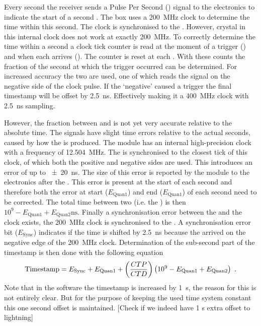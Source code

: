 Every second the \gps receiver sends a Pulse Per Second (\pps) signal to the \hisparc electronics to indicate the start of a second \cite{verkooijen2008firmware}. The \hisparc box uses a \SI{200}{\mega\hertz} clock to determine the time within this second. The clock is synchronised to the \pps. However, crystal in this internal clock does not work at exactly \SI{200}{\mega\hertz}. To correctly determine the time within a second a clock tick counter is read at the moment of a trigger (\ctd) and when each \pps arrives (\ctp). The counter is reset at each \pps. With these counts the fraction of the second at which the trigger occurred can be determined. For increased accuracy the two \adcs are used, one of which reads the signal on the negative side of the clock pulse. If the `negative' \adc caused a trigger the final timestamp will be offset by \SI{2.5}{\ns}. Effectively making it a \SI{400}{\mega\hertz} clock with \SI{2.5}{\ns} sampling.

However, the fraction between \ctd and \ctp is not yet very accurate relative to the absolute \gps time. The \pps signals have slight time errors relative to the actual \gps seconds, caused by how the \pps is produced. The \gps module has an internal high-precision clock with a frequency of  \SI{12.504}{\mega\hertz}. The \pps is synchronised to the closest tick of this clock, of which both the positive and negative sides are used. This introduces an error of up to \SI{\pm 20}{\ns}. The size of this error is reported by the \gps module to the electronics after the \pps. This error is present at the start of each second and therefore both the error at start ($E_{\mathrm{Quan1}}$) and end ($E_{\mathrm{Quan1}}$) of each second need to be corrected. The total time between two \pps (i.e. the \ctp) is then $10^9 - E_{\mathrm{Quan1}} + E_{\mathrm{Quan2}} \si{\ns}$. Finally a synchronisation error between the \pps and the \hisparc clock exists, the \SI{200}{\mega\hertz} clock is synchronised to the \pps. A synchronisation error bit ($E_{\mathrm{Sync}}$) indicates if the time is shifted by \SI{2.5}{\ns} because the \pps arrived on the negative edge of the \SI{200}{\mega\hertz} clock.
Determination of the sub-second part of the timestamp is then done with the following equation
%
\begin{equation}
\label{eq:timestamp}
    \mathrm{Timestamp} =
        E_{\mathrm{Sync}} + E_{\mathrm{Quan1}} + \left(\frac{\ctd}{\ctp}\right)
        \left(10^9 - E_{\mathrm{Quan1}} + E_{\mathrm{Quan2}}\right) \ .
\end{equation}
%
Note that in the \hisparc software the timestamp is increased by \SI{1}{\second}, the reason for this is not entirely clear. But for the purpose of keeping the used time system constant this one second offset is maintained. [Check if we indeed have 1 s extra offset to lightning]

